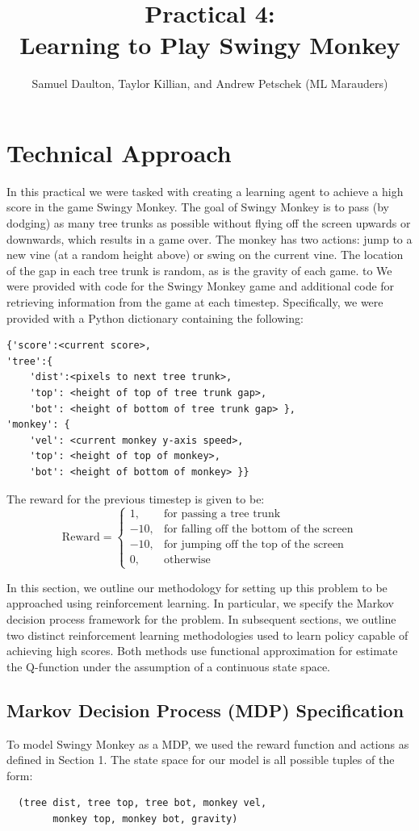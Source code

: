 \documentclass[11pt, oneside]{article}   	%
\title{Practical 4:\\
 Learning to Play Swingy Monkey}
\author{Samuel Daulton, Taylor Killian, and Andrew Petschek (ML Marauders)}
\begin{document}
\maketitle
\section{Technical Approach}
In this practical we were tasked with creating a learning agent to achieve a high score in the game Swingy Monkey. The goal of Swingy Monkey is to pass (by dodging) as many tree trunks as possible without flying off the screen upwards or downwards, which results in a game over.  The monkey has two actions: jump to a new vine (at a random height above) or swing on the current vine.   The location of the gap in each tree trunk is random, as is the gravity of each game.  to We were provided with code for the Swingy Monkey game and additional code for retrieving information from the game at each timestep.  Specifically, we were provided with a Python dictionary containing the following:
\begin{verbatim}
{'score':<current score>,
'tree':{
    'dist':<pixels to next tree trunk>,
    'top': <height of top of tree trunk gap>,
    'bot': <height of bottom of tree trunk gap> },
'monkey': {
    'vel': <current monkey y-axis speed>,
    'top': <height of top of monkey>,
    'bot': <height of bottom of monkey> }}
\end{verbatim}
The reward for the previous timestep is given to be:
$$
\text{Reward} =
\begin{cases}
1, & \text{for passing a tree trunk} \\
-10, & \text{for falling off the bottom of the screen}\\
-10, & \text{for jumping off the top of the screen}\\
0, & \text{otherwise}
\end{cases}
$$


In this section, we outline our methodology for setting up this problem to be approached using reinforcement learning.  In particular, we specify the Markov decision process framework for the problem.  In subsequent sections, we outline two distinct reinforcement learning methodologies used to learn policy capable of achieving high scores.  Both methods use functional approximation for estimate the Q-function under the assumption of a continuous state space.
\subsection{Markov Decision Process (MDP) Specification}
To model Swingy Monkey as a MDP, we used the reward function and actions as defined in Section 1.  The state space for our model is all possible tuples of the form:                                                                                                                                                                  
\begin{verbatim}
  (tree dist, tree top, tree bot, monkey vel,
        monkey top, monkey bot, gravity)
\end{verbatim}
\end{document}
